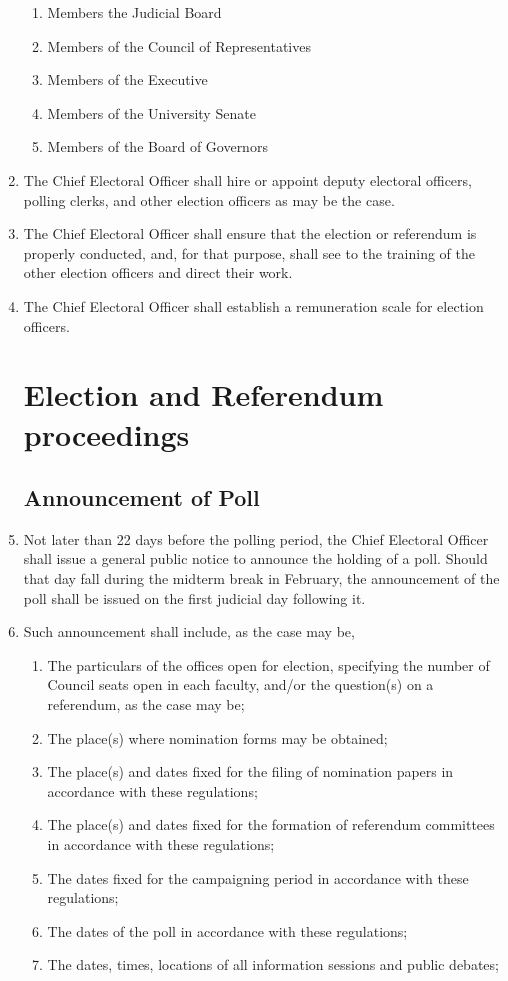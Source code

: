 \documentclass[oneside]{book}
\begin{document}
\begin{enumerate}
\begin{enumerate}
\item Members the Judicial Board 
\item Members of the Council of Representatives 
\item Members of the Executive 
\item Members of the University Senate 
\item Members of the Board of Governors 
\end{enumerate}
\item The Chief Electoral Officer shall hire or appoint deputy electoral
officers, polling clerks, and other election officers as may be the
case. 
\item The Chief Electoral Officer shall ensure that the election or referendum
is properly conducted, and, for that purpose, shall see to the training
of the other election officers and direct their work. 
\item The Chief Electoral Officer shall establish a remuneration scale for
election officers. 

\chapter{\label{Election_and_Referendum_proceedings}Election and Referendum
proceedings }


\section{\label{Announcement_of_Poll}Announcement of Poll }
\item Not later than 22 days before the polling period, the Chief Electoral
Officer shall issue a general public notice to announce the holding
of a poll. Should that day fall during the midterm break in February, the announcement 
of the poll shall be issued on the first judicial day following it.
\item Such announcement shall include, as the case may be, 

\begin{enumerate}
\item The particulars of the offices open for election, specifying the number
of Council seats open in each faculty, and/or the question(s) on a
referendum, as the case may be; 
\item The place(s) where nomination forms may be obtained; 
\item The place(s) and dates fixed for the filing of nomination papers in
accordance with these regulations; 
\item The place(s) and dates fixed for the formation of referendum committees
in accordance with these regulations; 
\item The dates fixed for the campaigning period in accordance with these
regulations; 
\item The dates of the poll in accordance with these regulations; 
\item The dates, times, locations of all information sessions and public
debates; 
\end{enumerate}

\end{enumerate}
\end{document}
